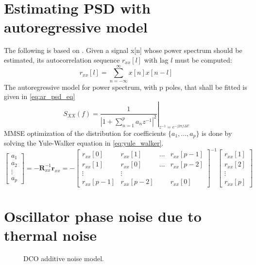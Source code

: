 	\appendix

	\section{Estimating PSD with autoregressive model}\label{yule_walker_ar_psd}
	The following is based on \cite{proakis_1993_psd}. Given a signal x[n] whose power spectrum should be estimated, its autocorrelation sequence $r_{xx}[l]$ with lag $l$ must be computed:
	\begin{equation}
		r_{xx}[l] = \sum_{n=-\infty}^{\infty} x[n]x[n-l]
	\end{equation}
	The autoregressive model for power spectrum, with p poles, that shall be fitted is given in \ref{eq:ar_psd_eq}
	\begin{equation}\label{eq:ar_psd_eq}
		S_{XX}(f) = \left.\frac{1}{|1+\sum_{n=1}^pa_nz^{-1}|^2}\right|_{z^{-1}=e^{-j2\pi f\Delta T}}
	\end{equation}
	MMSE optimization of the distribution for coefficients $\{a_1, ..., a_p\}$ is done by solving the Yule-Walker equation in \ref{eq:yule_walker}.
	\begin{equation} \label{eq:yule_walker}
	\begin{bmatrix}
	a_1\\ 
	a_2\\
	\vdots\\
	a_p
	\end{bmatrix} = 
	-\mathbf{R}_{xx}^{-1}\mathbf{r}_{xx}=
	-\begin{bmatrix}
	r_{xx}[0] & r_{xx}[1] & \dots & r_{xx}[p-1]\\ 
	r_{xx}[1] & r_{xx}[0] & \dots & r_{xx}[p-2]\\ 
	\vdots & \vdots &  & \\
	r_{xx}[p-1] & r_{xx}[p-2] &  & r_{xx}[0]
	\end{bmatrix}^{-1}
	\begin{bmatrix}
	r_{xx}[1]\\ 
	r_{xx}[2]\\
	\vdots\\
	r_{xx}[p]
	\end{bmatrix}
	\end{equation}


	\section{Oscillator phase noise due to thermal noise}\label{osc_pn_additive_append}


	\begin{figure}[htb!]
		\center
		\caption{DCO additive noise model.}
		\label{fig:dco_noise2}
	\end{figure}
	\FloatBarrier

